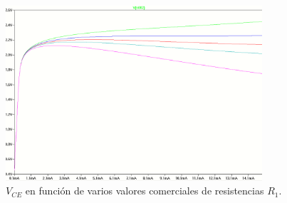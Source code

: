 \begin{figure}[H]
\centering
\includegraphics[width=0.85\textwidth]{img/barrido.png}
\caption{$V_{CE}$ en función de varios valores comerciales de resistencias $R_1$.}
\label{vbe_barrido} 
\end{figure}




%
%
%
%


\bigskip